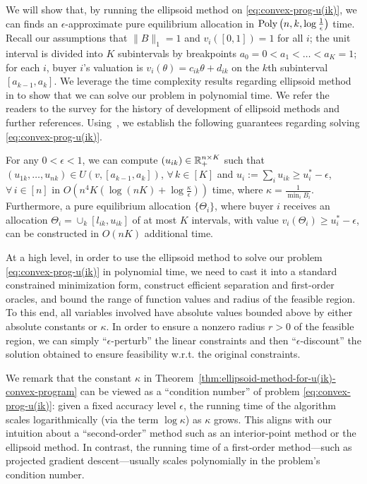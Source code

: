 We will show that, by running the ellipsoid method on \eqref{eq:convex-prog-u(ik)}, we can finds an $\epsilon$-approximate pure equilibrium allocation in $\textnormal{Poly}\left(n,k,\log \frac{1}{\epsilon}\right)$ time. 
Recall our assumptions that $\|B\|_1 = 1$ and $v_i([0,1]) = 1$ for all $i$; the unit interval is divided into $K$ subintervals by breakpoints $a_0 = 0 < a_1 < \dots < a_K = 1$; for each $i$, buyer $i$'s valuation is $v_i(\theta) = c_{ik}\theta+d_{ik}$ on the $k$th subinterval $[a_{k-1}, a_k]$. We leverage the time complexity results regarding ellipsoid method in \citep[\S 4.1.4]{ben2019lectures} to show that we can solve our problem in polynomial time.
We refer the readers to the survey \citep{bland1981ellipsoid} for the history of development of ellipsoid methods and further references.
Using~\cite[Theorem 4.1.2]{ben2019lectures}, we establish the following guarantees regarding solving \eqref{eq:convex-prog-u(ik)}.
\begin{theorem}
	For any $0 < \epsilon < 1$, we can compute $(u_{ik})\in \mathbb{R}_+^{n\times K}$ such that $(u_{1k}, \dots, u_{nk})\in U(v, [a_{k-1}, a_k])$, $\forall\, k\in [K]$ and $u_i := \sum_i u_{ik} \geq u^*_i - \epsilon$, $\forall\, i \in [n]$
	in $O\left( n^4 K \left( \log(nK) + \log \frac{\kappa}{\epsilon} \right) \right)$ time, where $\kappa = \frac{1}{\min_i B_i}$.
	Furthermore, a pure equilibrium allocation $\{\Theta_i\}$, where buyer $i$ receives an allocation $\Theta_i = \cup_k [l_{ik}, u_{ik}]$ of at most $K$ intervals,
	with value $v_i(\Theta_i) \geq u^*_i - \epsilon$,
	can be constructed in $O(nK)$ additional time. 
	\label{thm:ellipsoid-method-for-u(ik)-convex-program}
\end{theorem}
At a high level, in order to use the ellipsoid method to solve our problem \eqref{eq:convex-prog-u(ik)} in polynomial time, we need to cast it into a standard constrained minimization form, construct efficient separation and first-order oracles, and bound the range of function values and radius of the feasible region. 
To this end, all variables involved have absolute values bounded above by either absolute constants or $\kappa$. In order to ensure a nonzero radius $r>0$ of the feasible region, we can simply ``$\epsilon$-perturb'' the linear constraints and then ``$\epsilon$-discount'' the solution obtained to ensure feasibility w.r.t. the original constraints.

We remark that the constant $\kappa$ in Theorem~\ref{thm:ellipsoid-method-for-u(ik)-convex-program} can be viewed as a ``condition number'' of problem \eqref{eq:convex-prog-u(ik)}: given a fixed accuracy level $\epsilon$, the running time of the algorithm scales logarithmically (via the term $\log \kappa$) as $\kappa$ grows. 
This aligns with our intuition about a ``second-order'' method such as an interior-point method or the ellipsoid method. 
In contrast, the running time of a first-order method---such as projected gradient descent---usually scales polynomially in the problem's condition number.

